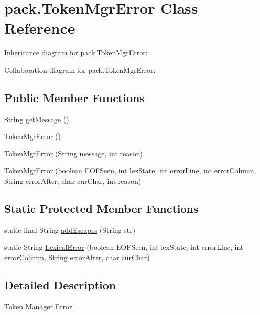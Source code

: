 \hypertarget{classpack_1_1_token_mgr_error}{}\section{pack.\+Token\+Mgr\+Error Class Reference}
\label{classpack_1_1_token_mgr_error}


Inheritance diagram for pack.\+Token\+Mgr\+Error\+:


Collaboration diagram for pack.\+Token\+Mgr\+Error\+:
\subsection*{Public Member Functions}
\begin{DoxyCompactItemize}
\item 
String \hyperlink{classpack_1_1_token_mgr_error_a5c69566d65230bc917affe5ce1075abe}{get\+Message} ()
\item 
\hyperlink{classpack_1_1_token_mgr_error_a43d072e1a903fb0bd58ac4e49dddf9c7}{Token\+Mgr\+Error} ()
\item 
\hyperlink{classpack_1_1_token_mgr_error_ae670f63792bb843cf50afff97d795f28}{Token\+Mgr\+Error} (String message, int reason)
\item 
\hyperlink{classpack_1_1_token_mgr_error_a9f5bf1ba2229fd2f210c925e5d6a3cb4}{Token\+Mgr\+Error} (boolean E\+O\+F\+Seen, int lex\+State, int error\+Line, int error\+Column, String error\+After, char cur\+Char, int reason)
\end{DoxyCompactItemize}
\subsection*{Static Protected Member Functions}
\begin{DoxyCompactItemize}
\item 
static final String \hyperlink{classpack_1_1_token_mgr_error_a9e70deb8d945b58b73531a3dc9fa344d}{add\+Escapes} (String str)
\item 
static String \hyperlink{classpack_1_1_token_mgr_error_ab86b73c712416a9391048dd142c90ff0}{Lexical\+Error} (boolean E\+O\+F\+Seen, int lex\+State, int error\+Line, int error\+Column, String error\+After, char cur\+Char)
\end{DoxyCompactItemize}


\subsection{Detailed Description}
\hyperlink{classpack_1_1_token}{Token} Manager Error. 

